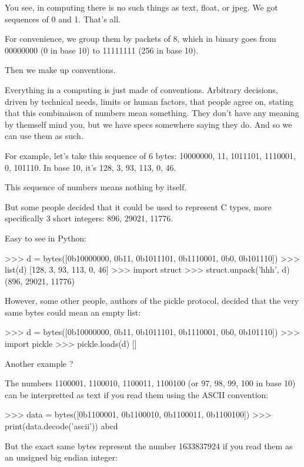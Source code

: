 You see, in computing there is no such things as text, float, or jpeg. We got sequences of 0 and 1. That's all.

For convenience, we group them by packets of 8, which in binary goes from 00000000 (0 in base 10) to 11111111 (256 in base 10).

Then we make up conventions.

Everything in a computing is just made of conventions. Arbitrary decisions, driven by technical needs, limits or human factors, that people agree on, stating that this combinaison of numbers mean something. They don't have any meaning by themself mind you, but we have specs somewhere saying they do. And so we can use them as such.

For example, let's take this sequence of 6 bytes: 10000000, 11, 1011101, 1110001, 0, 101110. In base 10, it's 128, 3, 93, 113, 0, 46.

This sequence of numbers means nothing by itself.

But some people decided that it could be used to represent C types, more specifically 3 short integers: 896, 29021, 11776.

Easy to see in Python:

\begin{py2and3}
>>> d = bytes([0b10000000, 0b11, 0b1011101, 0b1110001, 0b0, 0b101110])
>>> list(d)
[128, 3, 93, 113, 0, 46]
>>> import struct
>>> struct.unpack('hhh', d)
(896, 29021, 11776)
\end{py2and3}

However, some other people, authors of the pickle protocol, decided that the very same bytes could mean an empty list:

\begin{py2and3}
>>> d = bytes([0b10000000, 0b11, 0b1011101, 0b1110001, 0b0, 0b101110])
>>> import pickle
>>> pickle.loads(d)
[]
\end{py2and3}

Another example ?

The numbers 1100001, 1100010, 1100011, 1100100 (or 97, 98, 99, 100 in base 10) can be interpretted as text if you read them using the ASCII convention:

\begin{py2and3}
>>> data = bytes([0b1100001, 0b1100010, 0b1100011, 0b1100100])
>>> print(data.decode('ascii'))
abcd
\end{py2and3}

But the exact same bytes represent the number 1633837924 if you read them as an unsigned big endian integer:

